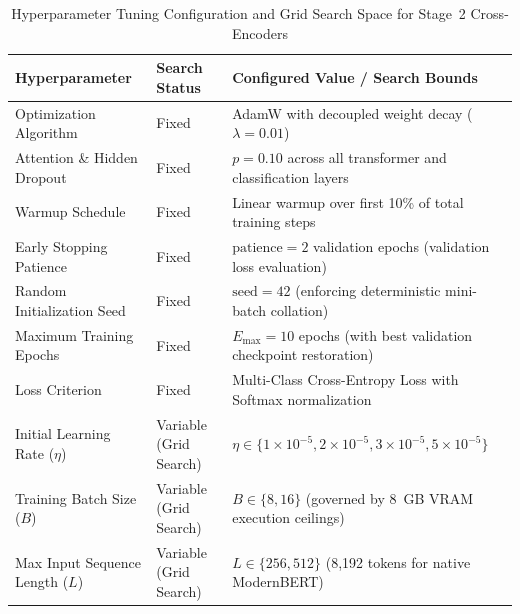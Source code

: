         \begin{table}[htbp]
            \centering
            \footnotesize
            \setlength{\tabcolsep}{4.5pt}
            \caption[Hyperparameter Tuning Configuration and Grid Search Space]{Hyperparameter Tuning Configuration and Grid Search Space for Stage~2 Cross-Encoders}
            \label{tab:hyperparameter_grid}
            \begin{tabularx}{\linewidth}{>{\RaggedRight}p{3.8cm}>{\RaggedRight}p{3.2cm}>{\RaggedRight}X}
                \toprule
                \textbf{Hyperparameter} & \textbf{Search Status} & \textbf{Configured Value / Search Bounds} \\
                \midrule
                Optimization Algorithm & Fixed & AdamW with decoupled weight decay ($\lambda = 0.01$)~\cite{loshchilov2019decoupled} \\
                Attention \& Hidden Dropout & Fixed & $p = 0.10$ across all transformer and classification layers~\cite{srivastava2014dropout} \\
                Warmup Schedule & Fixed & Linear warmup over first 10\% of total training steps \\
                Early Stopping Patience & Fixed & $\text{patience} = 2$ validation epochs (validation loss evaluation)~\cite{prechelt1998early} \\
                Random Initialization Seed & Fixed & $\text{seed} = 42$ (enforcing deterministic mini-batch collation) \\
                Maximum Training Epochs & Fixed & $E_{\max} = 10$ epochs (with best validation checkpoint restoration) \\
                Loss Criterion & Fixed & Multi-Class Cross-Entropy Loss with Softmax normalization \\
                \midrule
                Initial Learning Rate ($\eta$) & Variable (Grid Search) & $\eta \in \{1\times 10^{-5}, 2\times 10^{-5}, 3\times 10^{-5}, 5\times 10^{-5}\}$ \\
                Training Batch Size ($B$) & Variable (Grid Search) & $B \in \{8, 16\}$ (governed by 8~GB VRAM execution ceilings) \\
                Max Input Sequence Length ($L$) & Variable (Grid Search) & $L \in \{256, 512\}$ (8,192 tokens for native ModernBERT) \\
                \bottomrule
            \end{tabularx}
        \end{table}

